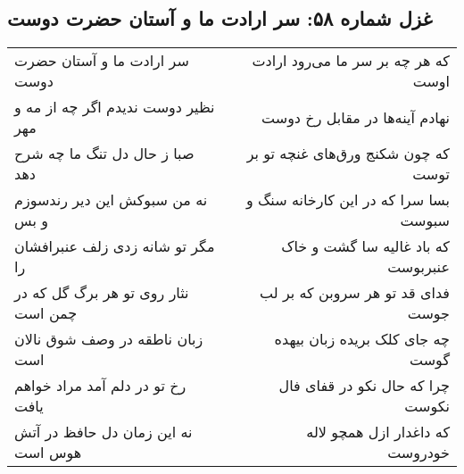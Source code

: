 \begin{center}
\section*{غزل شماره ۵۸: سر ارادت ما و آستان حضرت دوست}
\label{sec:sh058}
\begin{longtable}{l p{0.5cm} r}
سر ارادت ما و آستان حضرت دوست
&&
که هر چه بر سر ما می‌رود ارادت اوست
\\
نظیر دوست ندیدم اگر چه از مه و مهر
&&
نهادم آینه‌ها در مقابل رخ دوست
\\
صبا ز حال دل تنگ ما چه شرح دهد
&&
که چون شکنج ورق‌های غنچه تو بر توست
\\
نه من سبوکش این دیر رندسوزم و بس
&&
بسا سرا که در این کارخانه سنگ و سبوست
\\
مگر تو شانه زدی زلف عنبرافشان را
&&
که باد غالیه سا گشت و خاک عنبربوست
\\
نثار روی تو هر برگ گل که در چمن است
&&
فدای قد تو هر سروبن که بر لب جوست
\\
زبان ناطقه در وصف شوق نالان است
&&
چه جای کلک بریده زبان بیهده گوست
\\
رخ تو در دلم آمد مراد خواهم یافت
&&
چرا که حال نکو در قفای فال نکوست
\\
نه این زمان دل حافظ در آتش هوس است
&&
که داغدار ازل همچو لاله خودروست
\\
\end{longtable}
\end{center}
